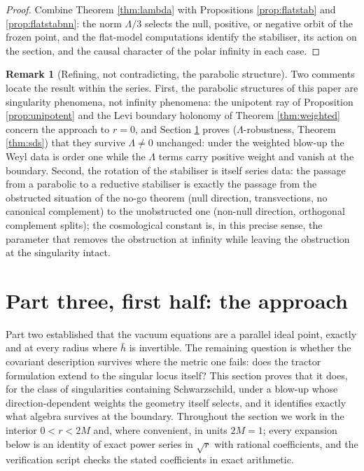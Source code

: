\documentclass[11pt]{article}
\theoremstyle{definition}
\newtheorem{remark}[theorem]{Remark}
\newcommand{\hb}{\bar{h}}
\begin{document}
\begin{proof}
Combine Theorem \ref{thm:lambda} with Propositions \ref{prop:flatstab} and \ref{prop:flatstabnn}: the norm $\Lambda/3$ selects the null, positive, or negative orbit of the frozen point, and the flat-model computations identify the stabiliser, its action on the section, and the causal character of the polar infinity in each case.
\end{proof}

\begin{remark}[Refining, not contradicting, the parabolic structure]\label{rem:lambdarobust}
Two comments locate the result within the series. First, the parabolic structures of this paper are singularity phenomena, not infinity phenomena: the unipotent ray of Proposition \ref{prop:unipotent} and the Levi boundary holonomy of Theorem \ref{thm:weighted} concern the approach to $r = 0$, and Section \ref{sec:approach} proves ($\Lambda$-robustness, Theorem \ref{thm:sds}) that they survive $\Lambda \neq 0$ unchanged: under the weighted blow-up the Weyl data is order one while the $\Lambda$ terms carry positive weight and vanish at the boundary. Second, the rotation of the stabiliser is itself series data: the passage from a parabolic to a reductive stabiliser is exactly the passage from the obstructed situation of the no-go theorem (null direction, transvections, no canonical complement) to the unobstructed one (non-null direction, orthogonal complement splits); the cosmological constant is, in this precise sense, the parameter that removes the obstruction at infinity while leaving the obstruction at the singularity intact.
\end{remark}

\section{Part three, first half: the approach}\label{sec:approach}

Part two established that the vacuum equations are a parallel ideal point, exactly and at every radius where $\hb$ is invertible. The remaining question is whether the covariant description survives where the metric one fails: does the tractor formulation extend to the singular locus itself? This section proves that it does, for the class of singularities containing Schwarzschild, under a blow-up whose direction-dependent weights the geometry itself selects, and it identifies exactly what algebra survives at the boundary. Throughout the section we work in the interior $0 < r < 2M$ and, where convenient, in units $2M = 1$; every expansion below is an identity of exact power series in $\sqrt{r}$ with rational coefficients, and the verification script checks the stated coefficients in exact arithmetic.
\end{document}
